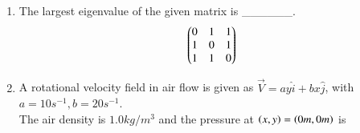 \documentclass[journal]{IEEEtran}
\begin{document}
\begin{enumerate}
        \item The largest eigenvalue of the given matrix is \_\_\_\_\_\_.
            \begin{align*}
                \begin{pmatrix}0&1&1\\1&0&1\\1&1&0\end{pmatrix}
            \end{align*}

        \item A rotational velocity field in air flow is given as $\overrightarrow{V} = ay\hat{i} + bx\hat{j}$, with $a=10 s^{-1},b=20 s^{-1}$.\\The air density is $1.0 kg/m^3$ and the pressure at $\left(x,y\right) = \left(0m, 0m\right)$ is 
\end{enumerate}


  
\end{document}
